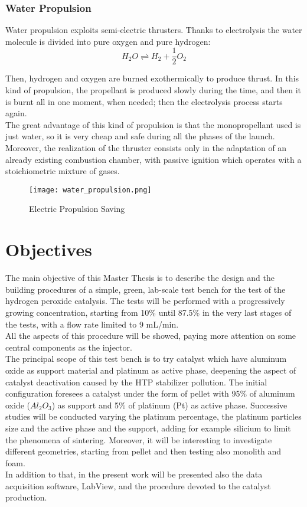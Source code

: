 \documentclass[a4paper]{report}
\begin{document}
\subsubsection{Water Propulsion}

Water propulsion exploits semi-electric thrusters. Thanks to electrolysis the water molecule is divided into pure oxygen and pure hydrogen: 
\begin{equation}
H_2O \rightleftharpoons H_2 + \frac{1}{2} O_2
\end{equation}

Then, hydrogen and oxygen are burned exothermically to produce thrust. In this kind of propulsion, the propellant is produced slowly during the time, and then it is burnt all in one moment, when needed; then the electrolysis process starts again. \\
The great advantage of this kind of propulsion is that the monopropellant used is just water, so it is very cheap and safe during all the phases of the launch. \\ 
Moreover, the realization of the thruster consists only in the adaptation of an already existing combustion chamber, with passive ignition which operates with a stoichiometric mixture of gases. \\

\begin{figure}[H]
\centering
\texttt{[image: water\_propulsion.png]}
\caption{Electric Propulsion Saving}
\end{figure}

\section{Objectives}

The main objective of this Master Thesis is to describe the design and the building procedures of a simple, green, lab-scale test bench for the test of the hydrogen peroxide catalysis. The tests will be performed with a progressively growing concentration, starting from 10\% until 87.5\% in the very last stages of the tests, with a flow rate limited to 9 mL/min.\\ 
All the aspects of this procedure will be showed, paying more attention on some central components as the injector.\\
The principal scope of this test bench is to try catalyst which have aluminum oxide as support material and platinum as active phase, deepening the aspect of catalyst deactivation caused by the HTP stabilizer pollution. The initial configuration foresees a catalyst under the form of pellet with 95\% of aluminum oxide ($Al_2O_3$) as support and 5\% of platinum (Pt) as active phase. Successive studies will be conducted varying the platinum percentage, the platinum particles size and the active phase and the support, adding for example silicium to limit the phenomena of sintering. Moreover, it will be interesting to investigate different geometries, starting from pellet and then testing also monolith and foam. \\
In addition to that, in the present work will be presented also the data acquisition software, LabView, and the procedure devoted to the catalyst production.\\
\end{document}
